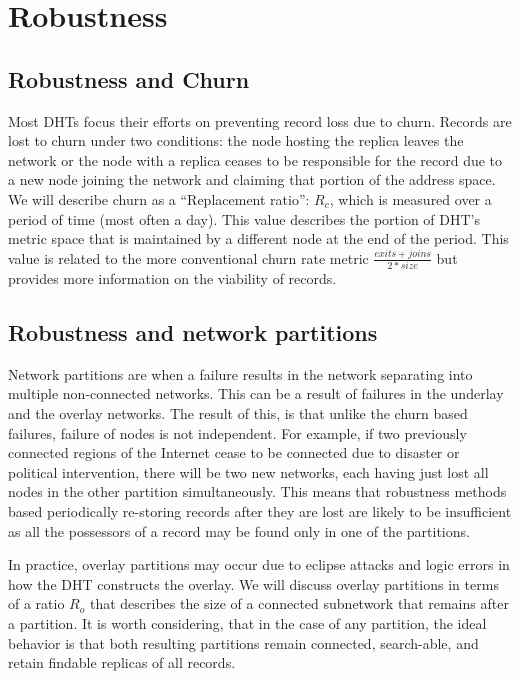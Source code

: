 \documentclass[conference]{IEEEtran}
\begin{document}
\section{Robustness}

\subsection{Robustness and Churn}
Most DHTs focus their efforts on preventing record loss due to churn.
Records are lost to churn under two conditions: the node hosting the replica leaves the network or the node with a replica ceases to be responsible for the record due to a new node joining the network and claiming that portion of the address space. 
We will describe churn as a ``Replacement ratio'': $R_{c}$, which is measured over a period of time (most often a day).
This value describes the portion of DHT's metric space that is maintained by a different node at the end of the period.
This value is related to the more conventional churn rate metric $\frac{exits + joins}{2*size}$ but provides more information on the viability of records.

\subsection{Robustness and network partitions}
Network partitions are when a failure results in the network separating into multiple non-connected networks.
This can be a result of failures in the underlay and the overlay networks.
The result of this, is that unlike the churn based failures, failure of nodes is not independent.
For example, if two previously connected regions of the Internet cease to be connected due to disaster or political intervention, there will be two new networks, each having just lost all nodes in the other partition simultaneously.
This means that robustness methods based periodically re-storing records after they are lost are likely to be insufficient as all the possessors of a record may be found only in one of the partitions.

In practice, overlay partitions may occur due to eclipse attacks and logic errors in how the DHT constructs the overlay.
We will discuss overlay partitions in terms of a ratio $R_{o}$ that describes the size of a connected subnetwork that remains after a partition.
It is worth considering, that in the case of any partition, the ideal behavior is that both resulting partitions remain connected, search-able, and retain findable replicas of all records.
\end{document}
